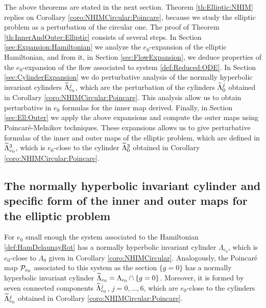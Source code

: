 The above theorems are stated in the next section.
Theorem \ref{th:Elliptic:NHIM} replies on Corollary \ref{coro:NHIMCircular:Poincare},
because we study the elliptic problem as a perturbation of the circular one.
The proof of Theorem  \ref{th:InnerAndOuter:Elliptic} consists of several steps.
In Section \ref{sec:Expansion:Hamiltonian} we analyze the $e_0$-expansion
of the elliptic Hamiltonian, and from it, in Section \ref{sec:FlowExpansion}, we deduce properties of the $e_0$-expansion of the flow associated to system \eqref{def:Reduced:ODE}. In Section \ref{sec:CylinderExpansion}
we do perturbative analysis of the normally hyperbolic invariant cylinders
$\widetilde\Lambda_{e_0}^j$, which are the perturbation of the cylinders $\widetilde\Lambda_{0}^j$ obtained in Corollary \ref{coro:NHIMCircular:Poincare}.  This analysis allow us to obtain perturbative in $e_0$ formulas for
the inner map derived. Finally, in Section \ref{sec:Ell:Outer} we apply the above expansions
and compute the outer maps using  Poincar{\'e}-Melnikov techniques.  These expansions allows us to give perturbative
formulas of the inner and outer maps of the elliptic problem, which are defined in $\widetilde\Lambda_{e_0}^3$, which is $e_0$-close to the cylinder $\widetilde\Lambda_{0}^3$ obtained in Corollary \ref{coro:NHIMCircular:Poincare}.






\subsection{The normally hyperbolic invariant cylinder and specific form of the inner and outer maps
  for the elliptic problem }\label{sec:Ell:NHIM}

For $e_0$ small enough the system associated to the Hamiltonian \eqref{def:HamDelaunayRot}
has a normally  hyperbolic invariant cylinder $\Lambda_{e_0}$, which is $e_0$-close to $\Lambda_0$
given in Corollary \ref{coro:NHIMCircular}. Analogously,  the Poincar\'e map $\mathcal{P}_{e_0}$ associated to this system as the section $\{g=0\}$ has a normally  hyperbolic invariant cylinder $\widetilde\Lambda_{e_0}=\Lambda_{e_0}\cap \{g=0\}$. Moreover, it is formed by seven connected components $\widetilde\Lambda_{e_0}^j$, $j=0,\ldots,6$, which are $e_0$-close to the cylinders $\widetilde\Lambda^j_{e_0}$ obtained in Corollary \ref{coro:NHIMCircular:Poincare}.

